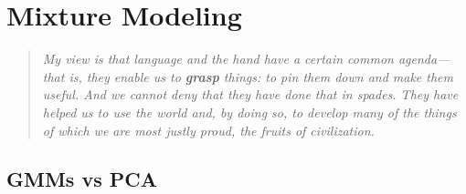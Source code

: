 \documentclass[../main.tex]{subfiles}
\begin{document}
\chapter{Mixture Modeling}\label{chap:gmms}

\bigskip
\begin{quote}
  \emph{My view is that language and the hand have a certain common agenda--- that is, they enable us to \textbf{grasp} things: to pin them down and make them useful. And we cannot deny that they have done that in spades. They have helped us to use the world and, by doing so, to develop many of the things of which we are most justly proud, the fruits of civilization.}\\
\end{quote}

\cleardoublepage%




\section{GMMs vs PCA}
\end{document}
